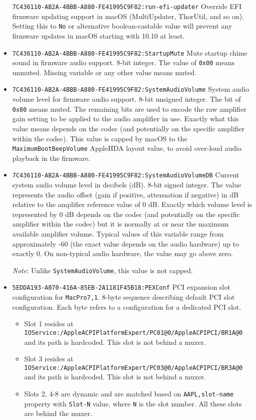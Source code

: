 \documentclass[]{article}
\providecommand{\tightlist}{%
  \setlength{\itemsep}{0pt}\setlength{\parskip}{0pt}}
\begin{document}
\begin{itemize}
  \texttt{7C436110-AB2A-4BBB-A880-FE41995C9F82:run-efi-updater}
  \break
  Override EFI firmware updating support in macOS (MultiUpdater, ThorUtil, and so on).
  Setting this to \texttt{No} or alternative boolean-castable value will prevent
  any firmware updates in macOS starting with 10.10 at least.
\item
  \texttt{7C436110-AB2A-4BBB-A880-FE41995C9F82:StartupMute}
  \break
  Mute startup chime sound in firmware audio support. 8-bit integer.
  The value of \texttt{0x00} means unmuted. Missing variable or any
  other value means muted.
\item
  \texttt{7C436110-AB2A-4BBB-A880-FE41995C9F82:SystemAudioVolume}
  \break
  System audio volume level for firmware audio support. 8-bit unsigned integer.
  The bit of \texttt{0x80} means muted. The remaining bits are used
  to encode the raw amplifier gain setting to be applied to the audio
  amplifier in use. Exactly what this value means depends on the codec
  (and potentially on the specific amplifier within the codec). This value
  is capped by macOS to the \texttt{MaximumBootBeepVolume} AppleHDA layout
  value, to avoid over-loud audio playback in the firmware.
  \item
  \texttt{7C436110-AB2A-4BBB-A880-FE41995C9F82:SystemAudioVolumeDB}
  \break
  Current system audio volume level in decibels (dB).  8-bit signed integer.
  The value represents the audio offset (gain if positive,
  attenuation if negative) in dB relative to the amplifier reference value
  of 0 dB. Exactly which volume level is represented by 0 dB depends on the
  codec (and potentially on the specific amplifier within the codec)
  but it is normally at or near the maximum available amplifier volume.
  Typical values of this variable range from approximately -60 (the exact value
  depends on the audio hardware) up to exactly 0. On non-typical audio
  hardware, the value may go above zero.

  \emph{Note}: Unlike \texttt{SystemAudioVolume}, this value is not capped.
\item
  \texttt{5EDDA193-A070-416A-85EB-2A1181F45B18:PEXConf}
  \break
  PCI expansion slot configuration for \texttt{MacPro7,1}.
  8-byte sequence describing default PCI slot configuration.
  Each byte refers to a configuration for a dedicated PCI slot.

  \begin{itemize}
    \tightlist
    \item Slot 1 resides at \texttt{IOService:/AppleACPIPlatformExpert/PC01@0/AppleACPIPCI/BR1A@0}
      and its path is hardcoded. This slot is not behind a muxer.
    \item Slot 3 resides at \texttt{IOService:/AppleACPIPlatformExpert/PC03@0/AppleACPIPCI/BR3A@0}
      and its path is hardcoded. This slot is not behind a muxer.
    \item Slots 2, 4-8 are dynamic and are matched based on \texttt{AAPL,slot-name} property
      with \texttt{Slot-N} value, where \texttt{N} is the slot number. All these slots are
      behind the muxer.
  \end{itemize}


\end{itemize}
\end{document}
